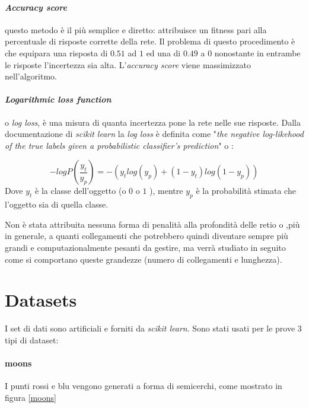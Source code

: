 \documentclass[12pt,a4paper]{report}
\begin{document}
\paragraph{\textit{Accuracy score}} questo metodo è il più semplice e diretto: attribuisce un fitness pari alla percentuale di risposte corrette della rete. Il problema di questo procedimento è che equipara una risposta di $0.51$ ad $1$ ed una di $0.49$ a $0$ nonostante in entrambe le risposte l'incertezza sia alta.
L'\textit{accuracy score} viene massimizzato nell'algoritmo.

\paragraph{\textit{Logarithmic loss function}} o \textit{log loss}, è una misura di quanta incertezza pone la rete nelle sue risposte. Dalla documentazione di \textit{scikit learn} la \textit{log loss} è definita come "\textit{the negative log-likehood of the true labels given a probabilistic classifier's prediction}" o :  

\begin{equation}
 -log P(\frac{y_{t}}{y_{p}}) = -(y_{t} log(y_{p}) + (1 - y_{t}) log(1 - y_{p}))
\end{equation}
Dove $y_{t}$ è la classe dell'oggetto (o $0$ o $1$ ), mentre $y_{p}$ è la probabilità stimata che l'oggetto sia di quella classe.

Non è stata attribuita nessuna forma di penalità alla profondità delle retio o ,più in generale, a quanti collegamenti  che potrebbero quindi diventare sempre più grandi e computazionalmente pesanti da gestire, ma verrà studiato in seguito come si comportano queste grandezze (numero di collegamenti e lunghezza). 

\section{Datasets}

I set di dati sono artificiali e forniti da \textit{scikit learn}. 
Sono stati usati per le prove 3 tipi di dataset:

\paragraph{moons} I punti rossi e blu vengono generati a forma di semicerchi, come mostrato in figura \ref{moons} 
\end{document}
